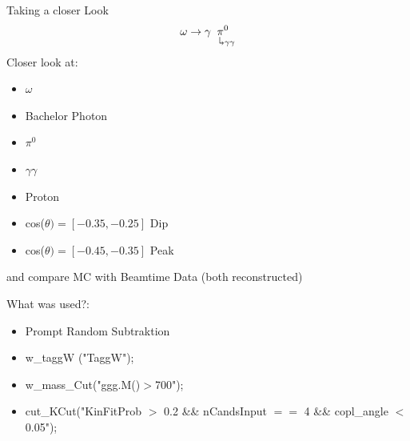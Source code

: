 \documentclass[
		10pt
		]{beamer}
\begin{document}
\begin{frame}{Taking a closer Look}
	\begin{equation*}
		\omega \rightarrow \gamma \underset{\hspace{0.25cm}\rotatebox[origin=c]{180}{$\Lsh$} \gamma \gamma 	}{\pi^0}
	\end{equation*}
	Closer look at:
	 
	 \begin{multicols}{2}
	
		\begin{itemize}
		
			\item $\omega$
			\item Bachelor Photon
			\item $\pi^0$
			\item $\gamma \gamma$
			\item Proton
			\item cos($\theta)=[-0.35,-0.25]$ Dip
			\item cos($\theta)=[-0.45,-0.35]$ Peak	
		
	
		\end{itemize}
	\end{multicols}

	and compare MC with Beamtime Data (both reconstructed)

	What was used?:

	\begin{itemize}
		\item  Prompt Random Subtraktion
		\item  w\_taggW ("TaggW");
		\item  w\_mass\_Cut("ggg.M()$>$700");
		\item  cut\_KCut("KinFitProb $>$ 0.2 \&\& nCandsInput $==$ 4 \&\& copl\_angle $<$ 0.05");
	\end{itemize}



\end{frame}
\fi
\end{document}
